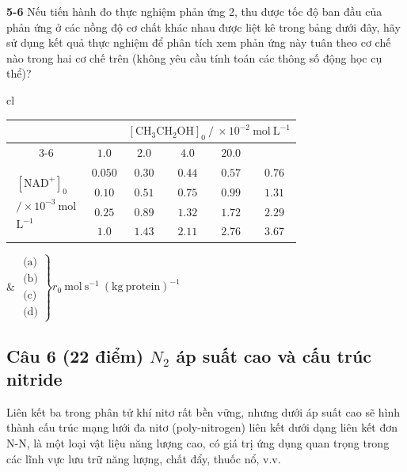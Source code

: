 \vspace{0.2cm}

\noindent
\textbf{5-6} Nếu tiến hành đo thực nghiệm phản ứng 2, thu được tốc độ ban đầu của phản ứng ở các nồng độ cơ chất khác nhau được liệt kê trong bảng dưới đây, hãy sử dụng kết quả thực nghiệm để phân tích xem phản ứng này tuân theo cơ chế nào trong hai cơ chế trên (không yêu cầu tính toán các thông số động học cụ thể)?

\begin{center}
\begin{tabular}{cl}
\begin{tabular}{|c|c|c|c|c|c|}
\hline
\multicolumn{2}{|c|}{\multirow{2}{*}{}} & \multicolumn{4}{c|}{$[\mathrm{CH_3CH_2OH}]_0\ /\ \times 10^{-2}\ \mathrm{mol\ L^{-1}}$} \\ \cline{3-6}
\multicolumn{2}{|c|}{} & $1.0$ & $2.0$ & $4.0$ & $20.0$ \\ \hline
\multirow{4}{*}{$\begin{array}{c} [\mathrm{NAD^+}]_0 \\ / \times 10^{-3}\ \mathrm{mol} \\ \mathrm{L^{-1}} \end{array}$} & $0.050$ & $0.30$ & $0.44$ & $0.57$ & $0.76$ \\ \cline{2-6}
& $0.10$ & $0.51$ & $0.75$ & $0.99$ & $1.31$ \\ \cline{2-6}
& $0.25$ & $0.89$ & $1.32$ & $1.72$ & $2.29$ \\ \cline{2-6}
& $1.0$ & $1.43$ & $2.11$ & $2.76$ & $3.67$ \\ \hline
\end{tabular}
&
$\left. \begin{array}{c} \text{(a)} \\ \text{(b)} \\ \text{(c)} \\ \text{(d)} \end{array} \right\} r_0\ \mathrm{mol\ s^{-1}\ (kg\ protein)^{-1}}$
\end{tabular}
\end{center}

\vspace{0.5cm}

\subsection{Câu 6 (22 điểm) $N_2$ áp suất cao và cấu trúc nitride}

Liên kết ba trong phân tử khí nitơ rất bền vững, nhưng dưới áp suất cao sẽ hình thành cấu trúc mạng lưới đa nitơ (poly-nitrogen) liên kết dưới dạng liên kết đơn N-N, là một loại vật liệu năng lượng cao, có giá trị ứng dụng quan trọng trong các lĩnh vực lưu trữ năng lượng, chất đẩy, thuốc nổ, v.v.

